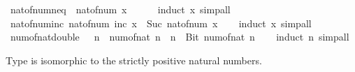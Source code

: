 \begin{isabellebody}
\ nat{\isacharunderscore}{\kern0pt}of{\isacharunderscore}{\kern0pt}num{\isacharunderscore}{\kern0pt}neq{\isacharunderscore}{\kern0pt}{}{\isacharcolon}{\kern0pt}\ {\isachardoublequoteopen}\ nat{\isacharunderscore}{\kern0pt}of{\isacharunderscore}{\kern0pt}num\ x\ {\isasymnoteq}\ {}{\isachardoublequoteclose}\isanewline
%
\isadelimproof
\ \ %
\endisadelimproof
%
\isatagproof
{}\isamarkupfalse%
\ {\isacharparenleft}{\kern0pt}induct\ x{\isacharparenright}{\kern0pt}\ simp{\isacharunderscore}{\kern0pt}all%
\endisatagproof
{\isafoldproof}%
%
\isadelimproof
\isanewline
%
\endisadelimproof
\isanewline
{}\isamarkupfalse%
\ nat{\isacharunderscore}{\kern0pt}of{\isacharunderscore}{\kern0pt}num{\isacharunderscore}{\kern0pt}inc{\isacharcolon}{\kern0pt}\ {\isachardoublequoteopen}nat{\isacharunderscore}{\kern0pt}of{\isacharunderscore}{\kern0pt}num\ {\isacharparenleft}{\kern0pt}inc\ x{\isacharparenright}{\kern0pt}\ {\isacharequal}{\kern0pt}\ Suc\ {\isacharparenleft}{\kern0pt}nat{\isacharunderscore}{\kern0pt}of{\isacharunderscore}{\kern0pt}num\ x{\isacharparenright}{\kern0pt}{\isachardoublequoteclose}\isanewline
%
\isadelimproof
\ \ %
\endisadelimproof
%
\isatagproof
{}\isamarkupfalse%
\ {\isacharparenleft}{\kern0pt}induct\ x{\isacharparenright}{\kern0pt}\ simp{\isacharunderscore}{\kern0pt}all%
\endisatagproof
{\isafoldproof}%
%
\isadelimproof
\isanewline
%
\endisadelimproof
\isanewline
{}\isamarkupfalse%
\ num{\isacharunderscore}{\kern0pt}of{\isacharunderscore}{\kern0pt}nat{\isacharunderscore}{\kern0pt}double{\isacharcolon}{\kern0pt}\ {\isachardoublequoteopen}{}\ {\isacharless}{\kern0pt}\ n\ {\isasymLongrightarrow}\ num{\isacharunderscore}{\kern0pt}of{\isacharunderscore}{\kern0pt}nat\ {\isacharparenleft}{\kern0pt}n\ {\isacharplus}{\kern0pt}\ n{\isacharparenright}{\kern0pt}\ {\isacharequal}{\kern0pt}\ Bit{}\ {\isacharparenleft}{\kern0pt}num{\isacharunderscore}{\kern0pt}of{\isacharunderscore}{\kern0pt}nat\ n{\isacharparenright}{\kern0pt}{\isachardoublequoteclose}\isanewline
%
\isadelimproof
\ \ %
\endisadelimproof
%
\isatagproof
{}\isamarkupfalse%
\ {\isacharparenleft}{\kern0pt}induct\ n{\isacharparenright}{\kern0pt}\ simp{\isacharunderscore}{\kern0pt}all%
\endisatagproof
{\isafoldproof}%
%
\isadelimproof
%
\endisadelimproof
%
\begin{isamarkuptext}%
Type  is isomorphic to the strictly positive natural numbers.%
\end{isamarkuptext}\isamarkuptrue%
\isamarkupfalse%

\end{isabellebody}

